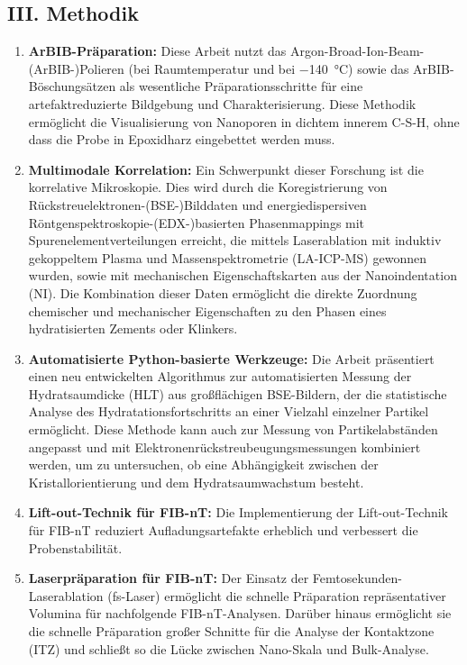 \documentclass[11pt, a4paper]{article}
\begin{document}
\subsection*{III. Methodik}

\begin{enumerate}[label=\textbf{\arabic*.}, leftmargin=1.5cm, labelsep=0.5cm, itemsep=0.5em, resume]
    \item \textbf{ArBIB-Präparation:} Diese Arbeit nutzt das Argon-Broad-Ion-Beam-(ArBIB-)Polieren (bei Raumtemperatur und bei \qty{-140}{\celsius}) sowie das ArBIB-Böschungsätzen als wesentliche Präparationsschritte für eine artefaktreduzierte Bildgebung und Charakterisierung.
    Diese Methodik ermöglicht die Visualisierung von Nanoporen in dichtem innerem C-S-H, ohne dass die Probe in Epoxidharz eingebettet werden muss.
    \item \textbf{Multimodale Korrelation:} Ein Schwerpunkt dieser Forschung ist die korrelative Mikroskopie. Dies wird durch die Koregistrierung von Rückstreuelektronen-(BSE-)Bilddaten und energiedispersiven Röntgenspektroskopie-(EDX-)basierten Phasenmappings mit Spurenelementverteilungen erreicht, die mittels Laserablation mit induktiv gekoppeltem Plasma und Massenspektrometrie (LA-ICP-MS) gewonnen wurden, sowie mit mechanischen Eigenschaftskarten aus der Nanoindentation (NI).
    Die Kombination dieser Daten ermöglicht die direkte Zuordnung chemischer und mechanischer Eigenschaften zu den Phasen eines hydratisierten Zements oder Klinkers.
    \item \textbf{Automatisierte Python-basierte Werkzeuge:} Die Arbeit präsentiert einen neu entwickelten Algorithmus zur automatisierten Messung der Hydratsaumdicke (HLT) aus großflächigen BSE-Bildern, der die statistische Analyse des Hydratationsfortschritts an einer Vielzahl einzelner Partikel ermöglicht.
    Diese Methode kann auch zur Messung von Partikelabständen angepasst und mit Elektronenrückstreubeugungsmessungen kombiniert werden, um zu untersuchen, ob eine Abhängigkeit zwischen der Kristallorientierung und dem Hydratsaumwachstum besteht.
    \item \textbf{Lift-out-Technik für FIB-nT:} Die Implementierung der Lift-out-Technik für FIB-nT reduziert Aufladungsartefakte erheblich und verbessert die Probenstabilität.
    \item \textbf{Laserpräparation für FIB-nT:} Der Einsatz der Femtosekunden-Laserablation (fs-Laser) ermöglicht die schnelle Präparation repräsentativer Volumina für nachfolgende FIB-nT-Analysen. Darüber hinaus ermöglicht sie die schnelle Präparation großer Schnitte für die Analyse der Kontaktzone (ITZ) und schließt so die Lücke zwischen Nano-Skala und Bulk-Analyse.
\end{enumerate}
\end{document}

